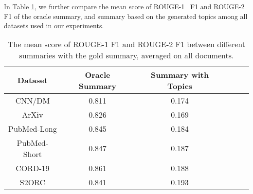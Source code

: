 \documentclass[11pt]{article}
\begin{document}
In Table \ref{tab:rouge}, we further compare the mean score of ROUGE-1~\cite{lin2003automatic} F1 and ROUGE-2 F1 of the oracle summary, and summary based on the generated topics among all datasets used in our experiments.
\begin{table}[!hbt]
\scriptsize
    \centering
\begin{tabular}{c|ccccc}
    \hline
    \bf{Dataset}& \bf{Oracle Summary}& \bf{Summary with Topics} \\
    \hline
    CNN/DM&0.811&0.174\\
    ArXiv&0.826&0.169\\
    PubMed-Long&0.845& 0.184\\
    PubMed-Short&0.847&0.187\\
    CORD-19 & 0.861&0.188\\
    S2ORC&0.841&0.193\\
    \hline
    \end{tabular}
\caption{The mean score of ROUGE-1 F1 and ROUGE-2 F1 between different summaries with the gold summary, averaged on all documents.}
    \label{tab:rouge}
\end{table}
\end{document}
